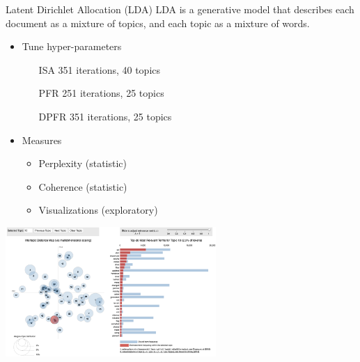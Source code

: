 \documentclass[10pt]{beamer}
\begin{document}
\begin{frame}{Latent Dirichlet Allocation (LDA)}
  LDA is a generative model that describes each document as a mixture of topics, and each topic as a mixture of words.

  \vspace{1em}

\begin{multicols}{2}
    \begin{itemize}
    \item Tune hyper-parameters %
      \begin{itemize}
      \item[ISA] 351 iterations, 40 topics
      \item[PFR] 251 iterations, 25 topics
      \item[DPFR] 351 iterations, 25 topics
      \end{itemize}
      \columnbreak
    \item Measures
    \begin{itemize}
    \item Perplexity (statistic)
    \item Coherence (statistic)
    \item Visualizations (exploratory)
    \end{itemize}
    \end{itemize}


\end{multicols}

    \includegraphics[width=0.6\textwidth]{LDAvis.png}

\end{frame}
\end{document}
